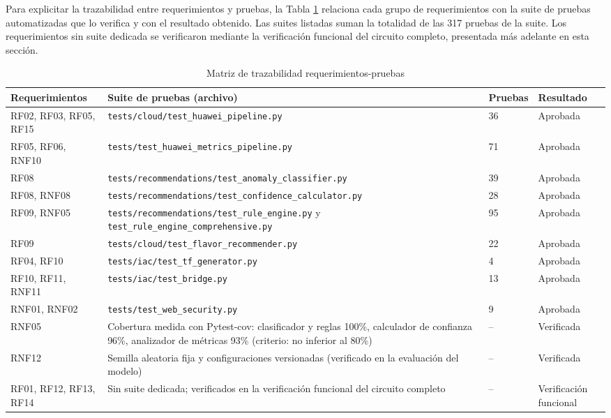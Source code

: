 Para explicitar la trazabilidad entre requerimientos y pruebas, la Tabla \ref{tab:req-pruebas} relaciona cada grupo de requerimientos con la suite de pruebas automatizadas que lo verifica y con el resultado obtenido. Las suites listadas suman la totalidad de las 317 pruebas de la suite. Los requerimientos sin suite dedicada se verificaron mediante la verificación funcional del circuito completo, presentada más adelante en esta sección.

\begin{table}[H]
\centering
\scriptsize
\setlength{\tabcolsep}{4pt}
\renewcommand{\arraystretch}{1.2}
\begin{tabular}{|p{2.5cm}|p{5.9cm}|p{1.2cm}|p{2.2cm}|}
\hline
\textbf{Requerimientos} & \textbf{Suite de pruebas (archivo)} & \textbf{Pruebas} & \textbf{Resultado} \\
\hline
RF02, RF03, RF05, RF15 & \texttt{tests/cloud/test\_huawei\_pipeline.py} & 36 & Aprobada \\
\hline
RF05, RF06, RNF10 & \texttt{tests/test\_huawei\_metrics\_pipeline.py} & 71 & Aprobada \\
\hline
RF08 & \texttt{tests/recommendations/test\_anomaly\_classifier.py} & 39 & Aprobada \\
\hline
RF08, RNF08 & \texttt{tests/recommendations/test\_confidence\_calculator.py} & 28 & Aprobada \\
\hline
RF09, RNF05 & \texttt{tests/recommendations/test\_rule\_engine.py} y \texttt{test\_rule\_engine\_comprehensive.py} & 95 & Aprobada \\
\hline
RF09 & \texttt{tests/cloud/test\_flavor\_recommender.py} & 22 & Aprobada \\
\hline
RF04, RF10 & \texttt{tests/iac/test\_tf\_generator.py} & 4 & Aprobada \\
\hline
RF10, RF11, RNF11 & \texttt{tests/iac/test\_bridge.py} & 13 & Aprobada \\
\hline
RNF01, RNF02 & \texttt{tests/test\_web\_security.py} & 9 & Aprobada \\
\hline
RNF05 & Cobertura medida con Pytest-cov: clasificador y reglas 100\%, calculador de confianza 96\%, analizador de métricas 93\% (criterio: no inferior al 80\%) & -- & Verificada \\
\hline
RNF12 & Semilla aleatoria fija y configuraciones versionadas (verificado en la evaluación del modelo) & -- & Verificada \\
\hline
RF01, RF12, RF13, RF14 & Sin suite dedicada; verificados en la verificación funcional del circuito completo & -- & Verificación funcional \\
\hline
\end{tabular}
\caption{Matriz de trazabilidad requerimientos-pruebas}
\label{tab:req-pruebas}
\end{table}

